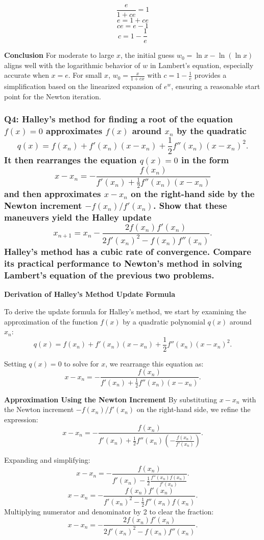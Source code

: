 \documentclass[8pt]{article}
\begin{document}
\[ \frac{e}{1 + ce} = 1 \]
\[ e = 1 + ce \]
\[ ce = e - 1 \]
\[ c = 1 - \frac{1}{e} \]

\textbf{Conclusion}
For moderate to large \(x\), the initial guess \(w_0 = \ln x - \ln(\ln x)\) aligns well with the logarithmic behavior of \(w\) in Lambert's equation, especially accurate when \(x = e\). For small \(x\), \(w_0 = \frac{x}{1 + cx}\) with \(c = 1 - \frac{1}{e}\) provides a simplification based on the linearized expansion of \(e^w\), ensuring a reasonable start point for the Newton iteration.

\subsubsection*{Q4: Halley’s method for finding a root of the equation \(f(x) = 0\) approximates \(f(x)\) around \(x_n\) by the quadratic
\[ q(x) = f(x_n) + f'(x_n)(x - x_n) + \frac{1}{2} f''(x_n)(x - x_n)^2. \]
It then rearranges the equation \(q(x) = 0\) in the form
\[ x - x_n = -\frac{f(x_n)}{f'(x_n) + \frac{1}{2} f''(x_n)(x - x_n)} \]
and then approximates \(x - x_n\) on the right-hand side by the Newton increment \(-f(x_n)/f'(x_n)\). Show that these maneuvers yield the Halley update
\[ x_{n+1} = x_n - \frac{2f(x_n)f'(x_n)}{2f'(x_n)^2 - f(x_n)f''(x_n)}. \]
Halley’s method has a cubic rate of convergence. Compare its practical performance to Newton’s method in solving Lambert’s equation of the previous two problems.}

\textbf{Derivation of Halley's Method Update Formula}

To derive the update formula for Halley's method, we start by examining the approximation of the function \(f(x)\) by a quadratic polynomial \(q(x)\) around \(x_n\):
\[ q(x) = f(x_n) + f'(x_n)(x - x_n) + \frac{1}{2} f''(x_n)(x - x_n)^2. \]

Setting \(q(x) = 0\) to solve for \(x\), we rearrange this equation as:
\[ x - x_n = -\frac{f(x_n)}{f'(x_n) + \frac{1}{2} f''(x_n)(x - x_n)}. \]

\textbf{Approximation Using the Newton Increment}
By substituting \(x - x_n\) with the Newton increment \(-f(x_n)/f'(x_n)\) on the right-hand side, we refine the expression:
\[ x - x_n = -\frac{f(x_n)}{f'(x_n) + \frac{1}{2} f''(x_n)\left(-\frac{f(x_n)}{f'(x_n)}\right)}. \]

Expanding and simplifying:
\[ x - x_n = -\frac{f(x_n)}{f'(x_n) - \frac{1}{2} \frac{f''(x_n)f(x_n)}{f'(x_n)}}. \]
\[ x - x_n = -\frac{f(x_n)f'(x_n)}{f'(x_n)^2 - \frac{1}{2} f''(x_n)f(x_n)}. \]
Multiplying numerator and denominator by 2 to clear the fraction:
\[ x - x_n = -\frac{2f(x_n)f'(x_n)}{2f'(x_n)^2 - f(x_n)f''(x_n)}. \]
\end{document}

